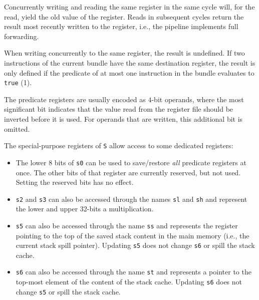 \documentclass[a4paper,fontsize=10pt,twoside,DIV15,BCOR12mm,headinclude=true,footinclude=false,pagesize,bibtotoc]{scrbook}
\newcommand{\comment}[3]{

\textsf{\textbf{#1}} {\color{#3}#2}}
\newcommand{\wolf}[1]{\comment{Wolfgang}{#1}{OliveGreen}}
\newcommand{\stefan}[1]{\comment{Stefan}{#1}{RoyalPurple}}
\renewcommand{\wolf}[1]{}
\renewcommand{\stefan}[1]{}
\begin{document}
Concurrently writing and reading the same register in the same cycle
will, for the read, yield the old value of the register. Reads in
subsequent cycles return the result most recently written to the
register, i.e., the pipeline implements full forwarding.

When writing concurrently to the same register, the result is
undefined. If two instructions of the current bundle have the same
destination register, the result is only defined if the predicate of
at most one instruction in the bundle evaluates to \texttt{true} (1).

\wolf{In practice, the result is even defined if both instructions
  write to the same register, but I would not make this a feature of
  the ISA.}

The predicate registers are usually encoded as $4$-bit operands, where the most
significant bit indicates that the value read from the register file should be
inverted before it is used. For operands that are written, this additional bit
is omitted.

The special-purpose registers of \texttt{S} allow access to some dedicated
registers:
\begin{itemize}
  \item The lower $8$ bits of \texttt{s0} can be used to save/restore
    \emph{all} predicate registers at once. The other bits of that
    register are currently reserved, but not used. Setting the reserved
	bits has no effect.
  \item \texttt{s2} and \texttt{s3} can also be accessed through the names
    \texttt{sl} and \texttt{sh} and represent the lower and upper
    32-bits a multiplication.
  \item \texttt{s5} can also be accessed through the name \texttt{ss} and
    represents the register pointing to the top of the saved stack
	content in the main memory (i.e., the current stack spill pointer).
	Updating \texttt{s5} does not change \texttt{s6} or spill the stack cache.
  \item \texttt{s6} can also be accessed through the name \texttt{st} and
    represents a pointer to the top-most element of the content of the
    stack cache.
	Updating \texttt{s6} does not change \texttt{s5} or spill the stack cache.
\end{itemize}

\stefan{None of the registers should be read-only, as they need to be restored when
we switch contexts.}
\end{document}
